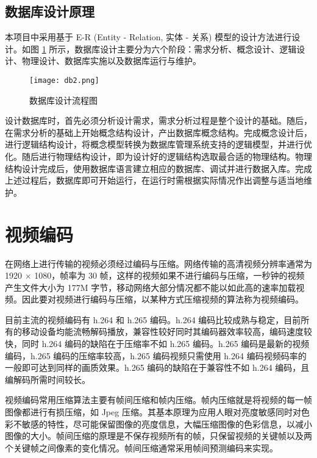 \subsection{数据库设计原理}

本项目中采用基于 E-R (Entity - Relation, 实体 - 关系) 模型的设计方法进行设计。如图 \ref{fig:db2} 所示，数据库设计主要分为六个阶段：需求分析、概念设计、逻辑设计、物理设计、数据库实施以及数据库运行与维护\cite{王珊2006数据库系统概论}。

\begin{figure}[!ht]
    \centering
    \texttt{[image: db2.png]}
    \caption{数据库设计流程图}
    \label{fig:db2}
\end{figure}

设计数据库时，首先必须分析设计需求，需求分析过程是整个设计的基础。随后，在需求分析的基础上开始概念结构设计，产出数据库概念结构。完成概念设计后，进行逻辑结构设计，将概念模型转换为数据库管理系统支持的逻辑模型，并进行优化。随后进行物理结构设计，即为设计好的逻辑结构选取最合适的物理结构。物理结构设计完成后，使用数据库语言建立相应的数据库、调试并进行数据入库。完成上述过程后，数据库即可开始运行，在运行时需根据实际情况作出调整与适当地维护\cite{wiederhold1983database}。


\section{视频编码}

在网络上进行传输的视频必须经过编码与压缩。网络传输的高清视频分辨率通常为 1920 $\times$ 1080，帧率为 30 帧，这样的视频如果不进行编码与压缩，一秒钟的视频产生文件大小为 177M 字节，移动网络大部分情况都不能以如此高的速率加载视频。因此要对视频进行编码与压缩，以某种方式压缩视频的算法称为视频编码。

目前主流的视频编码有 h.264\cite{richardson2004h} 和 h.265\cite{万帅2014新一代高效视频编码} 编码。h.264 编码比较成熟与稳定，目前所有的移动设备均能流畅解码播放，兼容性较好同时其编码器效率较高，编码速度较快，同时 h.264 编码的缺陷在于压缩率不如 h.265 编码。h.265 编码是最新的视频编码，h.265 编码的压缩率较高，h.265 编码视频只需使用 h.264 编码视频码率的一般即可达到同样的画质效果。h.265 编码的缺陷在于兼容性不如 h.264 编码，且编解码所需时间较长。

视频编码常用压缩算法主要有帧间压缩和帧内压缩。帧内压缩就是将视频的每一帧图像都进行有损压缩，如 Jpeg 压缩。其基本原理为应用人眼对亮度敏感同时对色彩不敏感的特性，尽可能保留图像的亮度信息，大幅压缩图像的色彩信息，以减小图像的大小。帧间压缩的原理是不保存视频所有的帧，只保留视频的关键帧以及两个关键帧之间像素的变化情况。帧间压缩通常采用帧间预测编码来实现\cite{richardson2004h}。

